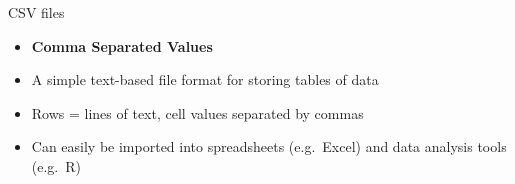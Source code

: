 \begin{frame}{CSV files}
	\begin{itemize}
		\pause\item \textbf{Comma Separated Values}
		\pause\item A simple text-based file format for storing tables of data
		\pause\item Rows = lines of text, cell values separated by commas
		\pause\item Can easily be imported into spreadsheets (e.g.\ Excel) and data analysis tools (e.g.\ R)
	\end{itemize}
\end{frame}
